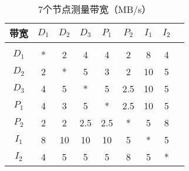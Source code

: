 \begin{table}[tb!]
	\centering
	\caption{7个节点测量带宽（MB/s）}
	\begin{tabular}{ccccccccc}
		\toprule
		\textsc{带宽}                       & \textsc{$D_1$}    & \textsc{$D_2$}    & \textsc{$D_3$}    & \textsc{$P_1$}   & \textsc{$P_2$}      & \textsc{$I_1$}   & \textsc{$I_2$}      \\[1pt]
		\midrule
		\\[-15pt]
		\textsc{$D_1$}                      & *              & 2              & 4           & 4       & 2       & 8      & 4         \\
		\textsc{$D_2$}                      & 2              & *              & 5           & 3       & 2       & 10      & 5        \\
		\textsc{$D_3$}                      & 4              & 5              & *           & 5       & 2.5     & 10      & 5        \\
		\textsc{$P_1$}                      & 4              & 3              & 5           & *       & 2.5     & 10      & 5        \\
		\textsc{$P_2$}                      & 2              & 2              & 2.5         & 2.5     & *       & 5      & 8         \\
		\textsc{$I_1$}                      & 8              & 10             & 10          & 10      & 5       & *      & 5         \\
		\textsc{$I_2$}                      & 4              & 5              & 5           & 5       & 8       & 5      & *         \\

\end{tabular}
\end{table}
